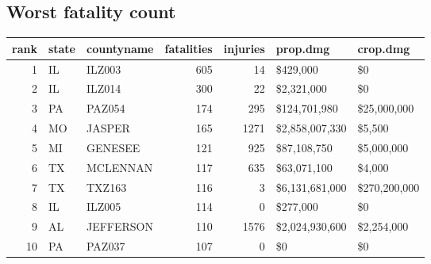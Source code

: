 \documentclass[]{article}
\newenvironment{Shaded}{\begin{snugshade}}{\end{snugshade}}
\newcommand{\KeywordTok}[1]{\textcolor[rgb]{0.13,0.29,0.53}{\textbf{{#1}}}}
\newcommand{\DataTypeTok}[1]{\textcolor[rgb]{0.13,0.29,0.53}{{#1}}}
\newcommand{\DecValTok}[1]{\textcolor[rgb]{0.00,0.00,0.81}{{#1}}}
\newcommand{\StringTok}[1]{\textcolor[rgb]{0.31,0.60,0.02}{{#1}}}
\newcommand{\NormalTok}[1]{{#1}}
\begin{document}
\subsection{Worst fatality count}\label{worst-fatality-count}

\begin{Shaded}
\end{Shaded}

\begin{longtable}[]{@{}rllrrll@{}}
\toprule
rank & state & countyname & fatalities & injuries & prop.dmg &
crop.dmg\tabularnewline
\midrule
\endhead
1 & IL & ILZ003 & 605 & 14 & \$429,000 & \$0\tabularnewline
2 & IL & ILZ014 & 300 & 22 & \$2,321,000 & \$0\tabularnewline
3 & PA & PAZ054 & 174 & 295 & \$124,701,980 &
\$25,000,000\tabularnewline
4 & MO & JASPER & 165 & 1271 & \$2,858,007,330 & \$5,500\tabularnewline
5 & MI & GENESEE & 121 & 925 & \$87,108,750 & \$5,000,000\tabularnewline
6 & TX & MCLENNAN & 117 & 635 & \$63,071,100 & \$4,000\tabularnewline
7 & TX & TXZ163 & 116 & 3 & \$6,131,681,000 &
\$270,200,000\tabularnewline
8 & IL & ILZ005 & 114 & 0 & \$277,000 & \$0\tabularnewline
9 & AL & JEFFERSON & 110 & 1576 & \$2,024,930,600 &
\$2,254,000\tabularnewline
10 & PA & PAZ037 & 107 & 0 & \$0 & \$0\tabularnewline
\bottomrule
\end{longtable}

\begin{Shaded}
\end{Shaded}
\end{document}
